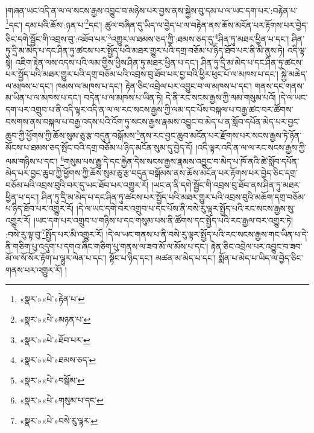།གཞན་ཡང་འདི་ན་ལ་ལ་སངས་རྒྱས་འབྱུང་བ་མཉེས་པར་བྱས་ནས་སྐྱེས་བུ་དམ་པ་ལ་ཡང་དག་པར་:བརྟེན་པ་\footnote{«སྣར་»«པེ་»རྟེན་པ་}དང་། དམ་པའི་ཆོས་:ཉན་པ་\footnote{«སྣར་»«པེ་»མཉན་པ་}དང་། ཚུལ་བཞིན་དུ་ཡིད་ལ་བྱེད་པ་ལ་བརྟེན་ནས་ཆོས་མངོན་པར་རྟོགས་པར་བྱེད་ཅིང་དགེ་སྦྱོང་གི་འབྲས་བུ་:འཐོབ་པར་\footnote{«སྣར་»«པེ་»ཐོབ་པར་}འགྱུར་ལ་ཐམས་ཅད་ཀྱི་:ཐམས་ཅད་དུ་\footnote{«སྣར་»«པེ་»ཐམས་ཅད་}ཤིན་ཏུ་མཐར་ཕྱིན་པ་དང་། ཤིན་ཏུ་དྲི་མ་མེད་པ་དང་ཤིན་ཏུ་ཚངས་པར་སྤྱོད་པའི་མཐར་གྱུར་པའི་དགྲ་བཅོམ་པ་ཉིད་ཐོབ་པར་ནི་མི་ནུས་ཏེ། འདི་ལྟ་སྟེ། འཇིག་རྟེན་ལས་འདས་པའི་ལམ་གྱིས་ཕྱིས་ཤིན་ཏུ་མཐར་ཕྱིན་པ་དང་། ཤིན་ཏུ་དྲི་མ་མེད་པ་དང་ཤིན་ཏུ་ཚངས་པར་སྤྱོད་པའི་མཐར་གྱུར་པའི་དགྲ་བཅོམ་པའི་འབྲས་བུ་ཐོབ་པར་བྱ་བའི་ཕྱིར་ཕུང་པོ་ལ་མཁས་པ་དང་། སྐྱེ་མཆེད་ལ་མཁས་པ་དང་། ཁམས་ལ་མཁས་པ་དང་། རྟེན་ཅིང་འབྲེལ་པར་འབྱུང་བ་ལ་མཁས་པ་དང་། གནས་དང་གནས་མ་ཡིན་པ་ལ་མཁས་པ་དང་། བདེན་པ་ལ་མཁས་པ་ཡིན་ཏེ། དེ་ནི་རང་སངས་རྒྱས་ཀྱི་ལམ་གསུམ་པའོ། །དེ་ལ་ཡང་དག་པར་འགྲུབ་པ་ནི་འདི་ལྟར་འདི་ན་ལ་ལ་རང་སངས་རྒྱས་ཀྱི་ལམ་དང་པོས་བསྐལ་པ་བརྒྱ་ཚང་བར་ཚོགས་བསགས་ནས་བསྐལ་པ་བརྒྱ་འདས་པའི་འོག་ཏུ་སངས་རྒྱས་རྣམས་འབྱུང་བ་མེད་པ་ན་སློབ་དཔོན་མེད་པར་བྱང་ཆུབ་ཀྱི་ཕྱོགས་ཀྱི་ཆོས་སུམ་ཅུ་རྩ་བདུན་བསྒོམས་\footnote{«སྣར་»«པེ་»བསྒོམ་}ནས་རང་བྱང་ཆུབ་མངོན་པར་རྫོགས་པར་སངས་རྒྱས་ཏེ་ཉོན་མོངས་པ་ཐམས་ཅད་སྤོང་བའི་དགྲ་བཅོམ་པ་ཉིད་མངོན་སུམ་དུ་བྱེད་དོ། །འདི་ལྟར་འདི་ན་ལ་ལ་རང་སངས་རྒྱས་ཀྱི་ལམ་གཉིས་པ་དང་། \footnote{«སྣར་»«པེ་»གསུམ་པ་དང་}གསུམ་པས་རྒྱུ་དེ་དང་རྐྱེན་དེས་སངས་རྒྱས་རྣམས་འབྱུང་བ་མེད་པ་ཁོ་ནའི་ཚེ་སློབ་དཔོན་མེད་པར་བྱང་ཆུབ་ཀྱི་ཕྱོགས་ཀྱི་ཆོས་སུམ་ཅུ་རྩ་བདུན་བསྒོམས་ནས་ཆོས་མངོན་པར་རྟོགས་པར་བྱེད་ཅིང་དགྲ་བཅོམ་པའི་འབྲས་བུའི་བར་དུ་ཡང་ཐོབ་པར་འགྱུར་རོ། །ཡང་ན་ནི་དགེ་སྦྱོང་གི་འབྲས་བུ་ཐོབ་ནས་ཤིན་ཏུ་མཐར་ཕྱིན་པ་དང་། ཤིན་ཏུ་དྲི་མ་མེད་པ་དང་ཤིན་ཏུ་ཚངས་པར་སྤྱོད་པའི་མཐར་གྱུར་པའི་འབྲས་བུའི་མཆོག་དགྲ་བཅོམ་པ་ཉིད་ཐོབ་པར་འགྱུར་རོ། །དེ་ལ་ཡང་དགེ་བར་འགྲུབ་པ་དང་པོས་ནི་བསེ་རུ་ལྟར་སྤྱོད་པའི་རང་སངས་རྒྱས་སུ་འགྱུར་རོ། །ཡང་དག་པར་འགྲུབ་པ་གཉིས་པ་དང་གསུམ་པས་ནི་ཚོགས་དང་སྤྱོད་པའི་རང་རྒྱལ་བར་འགྱུར་ཏེ། :བསེ་རུ་ལྟ་བུ་\footnote{«སྣར་»«པེ་»བསེ་རུ་ལྟར་}སྤྱོད་པར་མི་འགྱུར་རོ། །དེ་ལ་ཡང་གནས་པ་ནི་བསེ་རུ་ལྟར་སྤྱོད་པའི་རང་སངས་རྒྱས་གང་ཡིན་པ་དེ་ནི་གཅིག་པུ་འདུག་པ་དགའ་ཞིང་གཅིག་པུ་གནས་ལ་ཟབ་མོ་ལ་མོས་པ་དང་། རྟེན་ཅིང་འབྲེལ་པར་འབྱུང་བ་ཟབ་མོ་ལ་སོ་སོར་རྟོག་པ་ལྷུར་ལེན་པ་དང་། སྟོང་པ་ཉིད་དང་། མཚན་མ་མེད་པ་དང་། སྨོན་པ་མེད་པ་ཡིད་ལ་བྱེད་ཅིང་གནས་པར་འགྱུར་རོ། །
